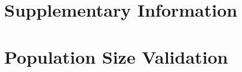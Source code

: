 \documentclass[11pt]{article}
\begin{document}
\printbibliography

\setcounter{table}{0}
\renewcommand{\thetable}{S\arabic{table}}
\setcounter{equation}{0}
\renewcommand{\theequation}{S\arabic{equation}}
\setcounter{section}{0}
\renewcommand{\thesection}{S\arabic{section}}
\setcounter{figure}{0}
\renewcommand{\thefigure}{S\arabic{figure}}

\section*{Supplementary Information}

\section{Population Size Validation}
\end{document}

